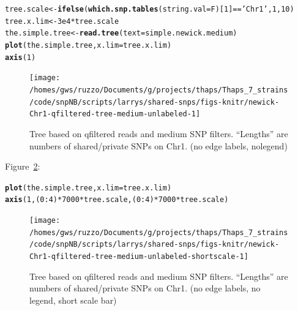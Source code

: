 \documentclass{article}\usepackage[]{graphicx}\usepackage[]{color}
\makeatletter
\newcommand{\hlnum}[1]{\textcolor[rgb]{0.686,0.059,0.569}{#1}}%
\newcommand{\hlstr}[1]{\textcolor[rgb]{0.192,0.494,0.8}{#1}}%
\newcommand{\hlopt}[1]{\textcolor[rgb]{0,0,0}{#1}}%
\newcommand{\hlstd}[1]{\textcolor[rgb]{0.345,0.345,0.345}{#1}}%
\newcommand{\hlkwb}[1]{\textcolor[rgb]{0.69,0.353,0.396}{#1}}%
\newcommand{\hlkwc}[1]{\textcolor[rgb]{0.333,0.667,0.333}{#1}}%
\newcommand{\hlkwd}[1]{\textcolor[rgb]{0.737,0.353,0.396}{\textbf{#1}}}%
\newenvironment{kframe}{%
 \def\at@end@of@kframe{}%
 \ifinner\ifhmode%
  \def\at@end@of@kframe{\end{minipage}}%
  \begin{minipage}{\columnwidth}%
 \fi\fi%
 \def\FrameCommand##1{\hskip\@totalleftmargin \hskip-\fboxsep
 \colorbox{shadecolor}{##1}\hskip-\fboxsep
     \hskip-\linewidth \hskip-\@totalleftmargin \hskip\columnwidth}%
 \MakeFramed {\advance\hsize-\width
   \@totalleftmargin\z@ \linewidth\hsize
   \@setminipage}}%
 {\par\unskip\endMakeFramed%
 \at@end@of@kframe}
\newenvironment{knitrout}{}{} %
\makeatother
\begin{document}
\begin{knitrout}\scriptsize
{}\color{fgcolor}\begin{kframe}
\begin{alltt}
\hlstd{tree.scale} \hlkwb{<-} \hlkwd{ifelse}\hlstd{(}\hlkwd{which.snp.tables}\hlstd{(}\hlkwc{string.val}\hlstd{=F)[}\hlnum{1}\hlstd{]}\hlopt{==}\hlstr{'Chr1'}\hlstd{,} \hlnum{1}\hlstd{,} \hlnum{10}\hlstd{)}
\hlstd{tree.x.lim} \hlkwb{<-} \hlnum{3e4} \hlopt{*} \hlstd{tree.scale}
\hlstd{the.simple.tree} \hlkwb{<-} \hlkwd{read.tree}\hlstd{(}\hlkwc{text}\hlstd{=simple.newick.medium)}
\hlkwd{plot}\hlstd{(the.simple.tree,} \hlkwc{x.lim} \hlstd{= tree.x.lim)}
\hlkwd{axis}\hlstd{(}\hlnum{1}\hlstd{)}
\end{alltt}
\end{kframe}\begin{figure}

{\centering \texttt{[image: /homes/gws/ruzzo/Documents/g/projects/thaps/Thaps\_7\_strains/code/snpNB/scripts/larrys/shared-snps/figs-knitr/newick-Chr1-qfiltered-tree-medium-unlabeled-1]} 

}

\caption[Tree based on qfiltered reads and medium SNP filters]{Tree based on qfiltered reads and medium SNP filters.  ``Lengths'' are numbers of shared/private SNPs on Chr1. (no edge labels, nolegend)}\label{fig:tree-medium-unlabeled}
\end{figure}


\end{knitrout}

Figure~\ref{fig:tree-medium-unlabeled-shortscale}:

\begin{knitrout}\scriptsize
{}\color{fgcolor}\begin{kframe}
\begin{alltt}
\hlkwd{plot}\hlstd{(the.simple.tree,} \hlkwc{x.lim} \hlstd{= tree.x.lim)}
\hlkwd{axis}\hlstd{(}\hlnum{1}\hlstd{,(}\hlnum{0}\hlopt{:}\hlnum{4}\hlstd{)}\hlopt{*}\hlnum{7000}\hlopt{*}\hlstd{tree.scale,(}\hlnum{0}\hlopt{:}\hlnum{4}\hlstd{)}\hlopt{*}\hlnum{7000}\hlopt{*}\hlstd{tree.scale)}
\end{alltt}
\end{kframe}\begin{figure}

{\centering \texttt{[image: /homes/gws/ruzzo/Documents/g/projects/thaps/Thaps\_7\_strains/code/snpNB/scripts/larrys/shared-snps/figs-knitr/newick-Chr1-qfiltered-tree-medium-unlabeled-shortscale-1]} 

}

\caption[Tree based on qfiltered reads and medium SNP filters]{Tree based on qfiltered reads and medium SNP filters.  ``Lengths'' are numbers of shared/private SNPs on Chr1. (no edge labels, no legend, short scale bar)}\label{fig:tree-medium-unlabeled-shortscale}
\end{figure}


\end{knitrout}
\end{document}
